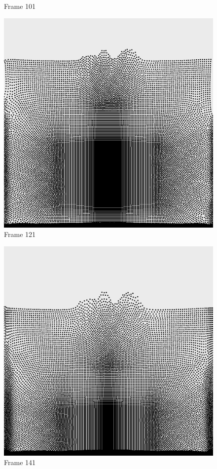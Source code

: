 \documentclass[a4paper, 12pt, oneside]{book}
\begin{document}
\begin{figure}[!ht]
\begin{center}
            Frame 101
        \end{center}
    \endminipage
    \hfill
        \begin{center}
            \includegraphics[width=\linewidth]{images/test_case_1/121.png}
            Frame 121
        \end{center}
    \endminipage
    \hfill
        \begin{center}
            \includegraphics[width=\linewidth]{images/test_case_1/141.png}
            Frame 141
        \end{center}
    \endminipage
    \hfill


\end{figure}
\end{document}

